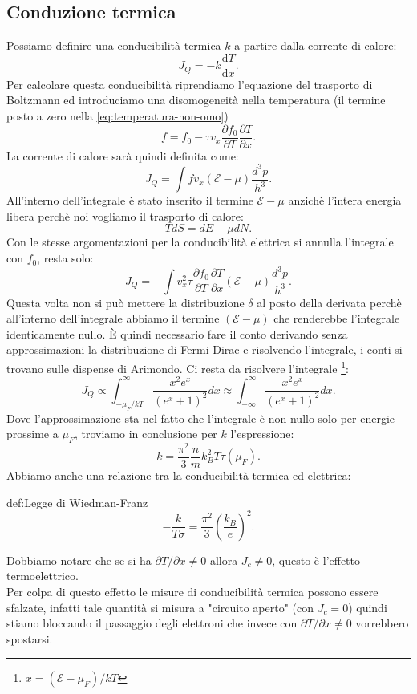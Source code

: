 \subsection{Conduzione termica}
\label{subsubsec:conduzione termica}
Possiamo definire una conducibilità termica $k$ a partire dalla corrente di calore:
\[
	J_Q 
	=
	-k \frac{\mbox{d} T}{\mbox{d} x} 
.\] 
Per calcolare questa conducibilità riprendiamo l'equazione del trasporto di Boltzmann ed introduciamo una disomogeneità nella temperatura (il termine posto a zero nella \ref{eq:temperatura-non-omo})
\[
	f 
	= 
	f_0
	-
	\tau v_x 
	\frac{\partial f_0}{\partial T} \frac{\partial T}{\partial x} 
.\] 
La corrente di calore sarà quindi definita come:
\[
	J_Q 
	=
	\int f v_x \left( \mathcal{E} - \mu  \right)  
	\frac{d^3 p}{h^3}
.\] 
All'interno dell'integrale è stato inserito il termine $\mathcal{E} - \mu $ anzichè l'intera energia libera perchè noi vogliamo il trasporto di calore:
\[
	TdS= dE - \mu dN
.\] 
Con le stesse argomentazioni per la conducibilità elettrica si annulla l'integrale con $f_0$, resta solo:
\[
	J_Q 
	=
	-\int v_x^2\tau 
		\frac{\partial f_0}{\partial T} \frac{\partial T}{\partial x} 
		\left( \mathcal{E} -\mu  \right) 
		\frac{d^3 p}{h^3}
.\] 
Questa volta non si può mettere la distribuzione $\delta $ al posto della derivata perchè all'interno dell'integrale abbiamo il termine $( \mathcal{E} - \mu)$ che renderebbe l'integrale identicamente nullo. 
È quindi necessario fare il conto derivando senza approssimazioni la distribuzione di Fermi-Dirac e risolvendo l'integrale, i conti si trovano sulle dispense di Arimondo. 
Ci resta da risolvere l'integrale \footnote{$x = \left( \mathcal{E} - \mu_F \right) /kT$}:
\[
	J_Q 
	\propto 
	\int_{-\mu_F /kT}^{\infty} \frac{x^2 e^x}{\left( e^x + 1 \right)^2}dx
	\approx
	\int_{-\infty}^{\infty} \frac{x^2 e^x}{\left( e^x + 1 \right)^2}dx
.\] 
Dove l'approssimazione sta nel fatto che l'integrale è non nullo solo per energie prossime a $\mu_F$, troviamo in conclusione per $k$ l'espressione:
\[
	k = \frac{\pi^2}{3} \frac{n}{m} k_B^2 T \tau ( \mu_F) 
.\] 
Abbiamo anche una relazione tra la conducibilità termica ed elettrica:
\begin{defn}{def:Legge di Wiedman-Franz}
	\[
		- \frac{k}{T\sigma } 
		=
		\frac{\pi^2}{3}\left( \frac{k_B}{e} \right)^2
	.\] 
\end{defn}
Dobbiamo notare che se si ha $\partial T /\partial x  \neq 0$ allora $J_c \neq 0$, questo è l'effetto termoelettrico. \\
Per colpa di questo effetto le misure di conducibilità termica possono essere sfalzate, infatti tale quantità si misura a "circuito aperto" (con $J_c = 0$) quindi stiamo bloccando il passaggio degli elettroni che invece con $\partial T / \partial x \neq 0 $ vorrebbero spostarsi.\\
